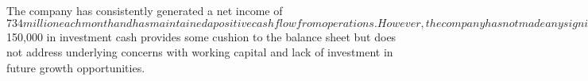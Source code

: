 The company has consistently generated a net income of $734 million each month and has maintained a positive cash flow from operations. However, the company has not made any significant capital expenditures, which may be a concern for long-term growth. The negative working capital indicates that the company may have difficulty meeting short-term obligations. The infusion of $150,000 in investment cash provides some cushion to the balance sheet but does not address underlying concerns with working capital and lack of investment in future growth opportunities.